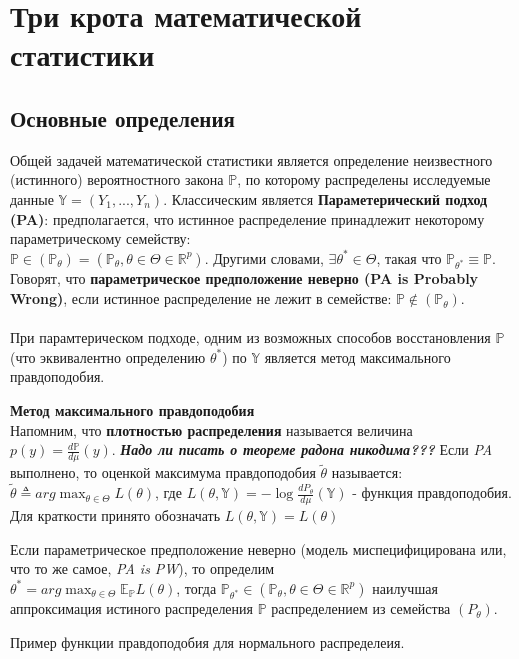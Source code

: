\section{Три крота математической статистики}

\subsection{Основные определения}
Общей задачей математической статистики является определение неизвестного (истинного) вероятностного закона  $\mathbb{P}$, по которому распределены исследуемые данные $\mathbb{Y} = (Y_1, ..., Y_n)$. Классическим является \textbf{Параметерический подход (PA)}:
предполагается, что истинное распределение принадлежит некоторому параметрическому семейству:\\
 $\mathbb{P} \in (\mathbb{P}_{\theta}) = (\mathbb{P}_{\theta}, \theta \in \Theta \in \mathbb{R}^p)$. Другими словами, $\exists \theta^* \in \Theta$, такая что $\mathbb{P}_{\theta^*} \equiv \mathbb{P}$.\\
 Говорят, что \textbf{параметрическое предположение неверно (PA is Probably Wrong)}, если истинное распределение не лежит в семействе:  $\mathbb{P} \not\in (\mathbb{P}_{\theta})$.\\
\\
При парамтерическом подходе, одним из возможных способов восстановления $\mathbb{P}$ (что эквивалентно определению $\theta^*$) по $\mathbb{Y}$ является метод максимального правдоподобия.

\begin{definition}\textbf{Метод максимального правдоподобия}\\
Напомним, что \textbf{плотностью распределения} называется величина $p(y) = \frac{d\mathbb{P}}{d\mathbb{\mu}}(y)$. \textbf{\textit{Надо ли писать о теореме радона никодима???}}
Если \textit{PA} выполнено, то оценкой максимума правдоподобия $\tilde{\theta}$ называется:
$\tilde{\theta} \triangleq arg\max_{\theta \in \Theta} L(\theta)$, где $L(\theta, \mathbb{Y}) = -\log \frac{dP_{\theta}}{d\mu}(\mathbb{Y})$ - функция правдоподобия. Для краткости принято обозначать $L(\theta, \mathbb{Y}) = L(\theta)$\\
\end{definition}

Если параметрическое предположение неверно (модель миспецифицирована или, что то же самое, \textit{PA is PW}), то определим\\
$\theta^* = arg\max_{\theta \in \Theta} \mathbb{E}_{\mathbb{P}} L(\theta)$, тогда $\mathbb{P}_{\theta^*} \in (\mathbb{P}_{\theta}, \theta \in \Theta \in \mathbb{R}^p) $ наилучшая аппроксимация истиного распределения $\mathbb{P}$ распределением из семейства $(P_{\theta})$.
\begin{example} Пример функции правдоподобия для нормального распределеия.
\end{example}

